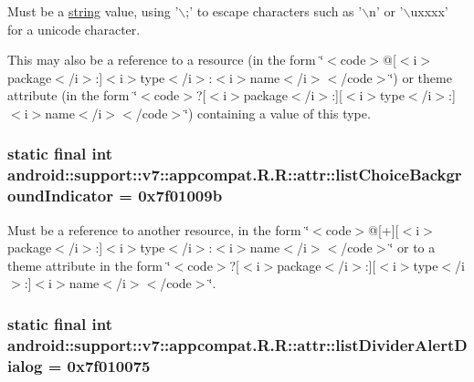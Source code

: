 Must be a \hyperlink{classandroid_1_1support_1_1v7_1_1appcompat_1_1_r_1_1string}{string} value, using '$\backslash$;' to escape characters such as '$\backslash$n' or '$\backslash$uxxxx' for a unicode character. 

This may also be a reference to a resource (in the form \char`\"{}$<$code$>$@\mbox{[}$<$i$>$package$<$/i$>$:\mbox{]}$<$i$>$type$<$/i$>$:$<$i$>$name$<$/i$>$$<$/code$>$\char`\"{}) or theme attribute (in the form \char`\"{}$<$code$>$?\mbox{[}$<$i$>$package$<$/i$>$:\mbox{]}\mbox{[}$<$i$>$type$<$/i$>$:\mbox{]}$<$i$>$name$<$/i$>$$<$/code$>$\char`\"{}) containing a value of this type. \hypertarget{classandroid_1_1support_1_1v7_1_1appcompat_1_1_r_1_1attr_5da1cfb828e8d56dd3ff215cf36a6dfa}{
\subsubsection[{listChoiceBackgroundIndicator}]{\setlength{\rightskip}{0pt plus 5cm}static final int android::support::v7::appcompat.R.R::attr::listChoiceBackgroundIndicator = 0x7f01009b}}
\label{classandroid_1_1support_1_1v7_1_1appcompat_1_1_r_1_1attr_5da1cfb828e8d56dd3ff215cf36a6dfa}


Must be a reference to another resource, in the form \char`\"{}$<$code$>$@\mbox{[}+\mbox{]}\mbox{[}$<$i$>$package$<$/i$>$:\mbox{]}$<$i$>$type$<$/i$>$:$<$i$>$name$<$/i$>$$<$/code$>$\char`\"{} or to a theme attribute in the form \char`\"{}$<$code$>$?\mbox{[}$<$i$>$package$<$/i$>$:\mbox{]}\mbox{[}$<$i$>$type$<$/i$>$:\mbox{]}$<$i$>$name$<$/i$>$$<$/code$>$\char`\"{}. \hypertarget{classandroid_1_1support_1_1v7_1_1appcompat_1_1_r_1_1attr_2b834a5899346a685d244ec6edb120be}{
\subsubsection[{listDividerAlertDialog}]{\setlength{\rightskip}{0pt plus 5cm}static final int android::support::v7::appcompat.R.R::attr::listDividerAlertDialog = 0x7f010075}}
\label{classandroid_1_1support_1_1v7_1_1appcompat_1_1_r_1_1attr_2b834a5899346a685d244ec6edb120be}


